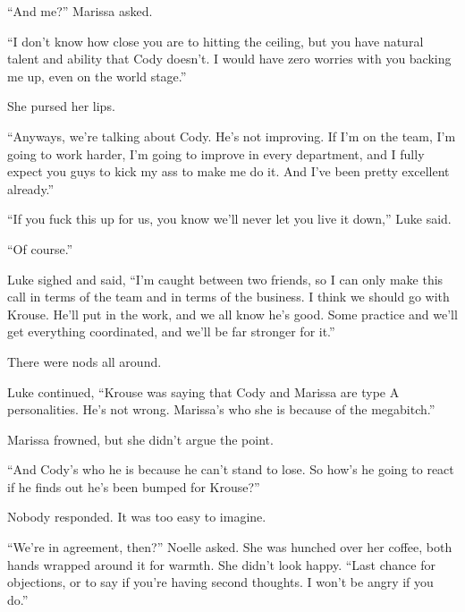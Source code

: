 ``And me?''  Marissa asked.



``I don't know how close you are to hitting the ceiling, but you have natural talent and ability that Cody doesn't.  I would have zero worries with you backing me up, even on the world stage.''



She pursed her lips.



``Anyways, we're talking about Cody.  He's not improving.  If I'm on the team, I'm going to work harder, I'm going to improve in every department, and I fully expect you guys to kick my ass to make me do it.  And I've been pretty excellent already.''



``If you fuck this up for us, you know we'll never let you live it down,'' Luke said.



``Of course.''



Luke sighed and said,  ``I'm caught between two friends, so I can only make this call in terms of the team and in terms of the business.  I think we should go with Krouse.  He'll put in the work, and we all know he's good.  Some practice and we'll get everything coordinated, and we'll be far stronger for it.''



There were nods all around.



Luke continued, ``Krouse was saying that Cody and Marissa are type A personalities.  He's not wrong.  Marissa's who she is because of the megabitch.''



Marissa frowned, but she didn't argue the point.



``And Cody's who he is because he can't stand to lose.  So how's he going to react if he finds out he's been bumped for Krouse?''



Nobody responded.  It was too easy to imagine.



``We're in agreement, then?'' Noelle asked.  She was hunched over her coffee, both hands wrapped around it for warmth.  She didn't look happy.  ``Last chance for objections, or to say if you're having second thoughts.  I won't be angry if you do.''




